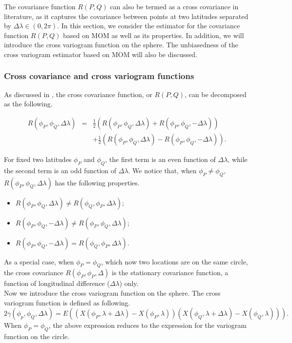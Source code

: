 The covariance function $R(P, Q)$ can also be termed as a cross covariance in literature, as it captures the covariance between points at two latitudes separated by $\Delta \lambda \in (0,2\pi)$. In this section, we consider the estimator for the covariance function $R(P, Q)$ based on MOM as well as its properties. In addition, we will introduce the cross variogram function on the sphere. The unbiasedness of the cross variogram estimator based on MOM will also be discussed. 	\\


\subsubsection{\bf Cross covariance and cross variogram functions}
As discussed in \cite{Wackernagel2013}, the cross covariance function, or $R(P, Q)$, can be decomposed as the following.

\begin{eqnarray*}
R(\phi_P, \phi_Q, \Delta \lambda) &=& \frac{1}{2}(R(\phi_P, \phi_Q, \Delta \lambda) + R(\phi_P, \phi_Q, -\Delta \lambda)) \\
& & + \frac{1}{2}(R(\phi_P, \phi_Q, \Delta \lambda) - R(\phi_P, \phi_Q, -\Delta \lambda)).
\end{eqnarray*}

For fixed two latitudes $\phi_P$ and $\phi_Q$, the first term is an even function of $\Delta \lambda$, while the second term is an odd function of $\Delta \lambda$. We notice that, when $\phi_P \ne \phi_Q$, $R(\phi_P, \phi_Q, \Delta \lambda)$ has the following properties.
\begin{itemize}
\item $R(\phi_P, \phi_Q, \Delta \lambda) \ne R(\phi_Q, \phi_P, \Delta \lambda)$;
\item $R(\phi_P, \phi_Q, -\Delta \lambda) \ne R(\phi_P, \phi_Q, \Delta \lambda)$;
\item $R(\phi_P, \phi_Q, -\Delta \lambda) = R(\phi_Q, \phi_P, \Delta \lambda)$.
\end{itemize}
As a special case, when $\phi_P = \phi_Q$, which now two locations are on the same circle, the cross covariance $R(\phi_P, \phi_P, \Delta)$ is the stationary covariance function, a function of longitudinal difference ($\Delta\lambda$) only. \\

Now we introduce the cross variogram function on the sphere. The cross variogram function is defined as following.
\[
2\gamma(\phi_p, \phi_Q, \Delta\lambda) = E\left((X(\phi_P, \lambda+\Delta \lambda) - X(\phi_P, \lambda))(X(\phi_Q, \lambda+\Delta \lambda) - X(\phi_Q, \lambda))\right).
\]
When $\phi_P = \phi_Q$, the above expression reduces to the expression for the variogram function on the circle. \\

